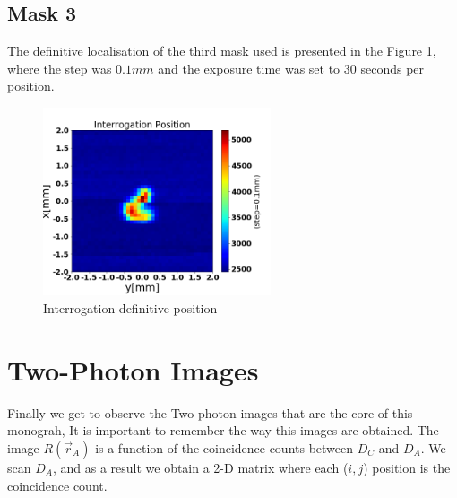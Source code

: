 \subsection{Mask 3}

The definitive localisation of the third mask used is presented in the Figure \ref{fig:localizationInte}, 
where the step was $0.1mm$ and the exposure time was set to 30 seconds per position.

\begin{figure}[h!]
\centering
\includegraphics[width=0.6\textwidth]{Figures/interrogationLocation.png} 
\caption{Interrogation definitive position}
\label{fig:localizationInte}
\end{figure}


\section{Two-Photon Images}

Finally we get to observe the Two-photon images that are the core of this monograh,
It is important to remember the way this images are obtained. The image $R(\vec{r}_A)$ is a 
function of the coincidence counts between $D_C$ and $D_A$. We scan $D_A$, and as a 
result we obtain a 2-D matrix where each ($i,j$) position is the coincidence count.

